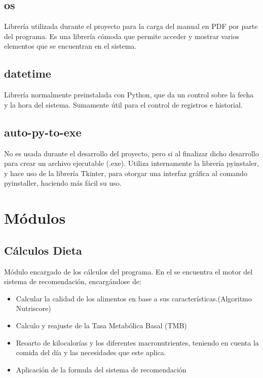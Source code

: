\subsection{os}
Librería utilizada durante el proyecto para la carga del manual en PDF por parte del programa. Es una librería cómoda que permite acceder y mostrar varios elementos que se encuentran en el sistema.
\subsection{datetime}
Librería normalmente preinstalada con Python, que da un control sobre la fecha y la hora del sistema. Sumamente útil para el control de registros  e historial.

\subsection{auto-py-to-exe}
No es usada durante el desarrollo del proyecto, pero si al finalizar dicho desarrollo para crear un archivo ejecutable (.exe). Utiliza internamente la librería pyinstaler, y hace uso de la librería Tkinter, para otorgar una interfaz gráfica al comando pyinstaller, haciendo más fácil su uso.

\section{Módulos}
\subsection{Cálculos Dieta}
Módulo encargado de los cálculos del programa. En el se encuentra el motor del sistema de recomendación, encargándose de:
\begin{itemize}
\item Calcular la calidad de los alimentos en base a sus características.(Algoritmo Nutriscore)
\item Calculo y reajuste de la Tasa Metabólica Basal (TMB)
\item Reoarto de kilocalorías y los diferentes macronutrientes, teniendo en cuenta la comida del día y las necesidades que este aplica.
\item Aplicación de la formula del sistema de recomendación
\end{itemize}

